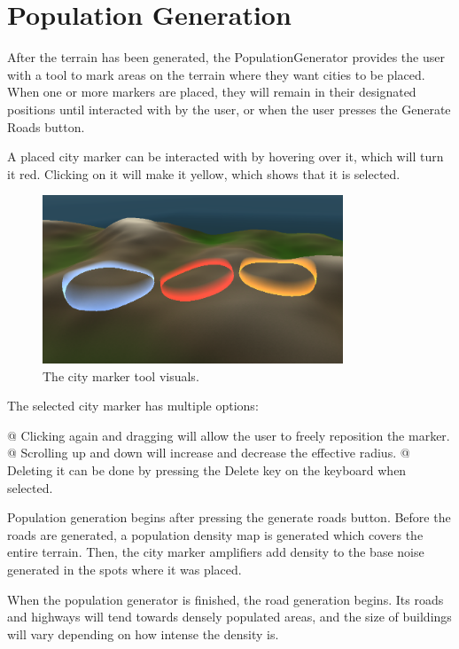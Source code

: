 \section{Population Generation}

After the terrain has been generated, the PopulationGenerator provides the user with a tool to mark areas on the terrain where they want cities to be placed. 
When one or more markers are placed, they will remain in their designated positions until interacted with by the user, or when the user presses the Generate Roads button.

A placed city marker can be interacted with by hovering over it, which will turn it red.
Clicking on it will make it yellow, which shows that it is selected. 

\begin{figure}[h!]
  \centering
  \includegraphics[width=0.8\textwidth]{figure/citymarkers.png}
  \caption{The city marker tool visuals. }
  \label{fig:citymarkers}
\end{figure}

The selected city marker has multiple options:
\begin{easylist}
  @ Clicking again and dragging will allow the user to freely reposition the marker.
  @ Scrolling up and down will increase and decrease the effective radius.
  @ Deleting it can be done by pressing the Delete key on the keyboard when selected.
\end{easylist}

Population generation begins after pressing the generate roads button.
Before the roads are generated, a population density map is generated which covers the entire terrain.
Then, the city marker amplifiers add density to the base noise generated in the spots where it was placed.

When the population generator is finished, the road generation begins.
Its roads and highways will tend towards densely populated areas, and the size of buildings will vary depending on how intense the density is.
